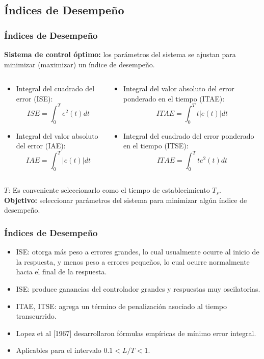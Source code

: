 \documentclass[aspectratio=169]{beamer}
\theoremstyle{definition}
\theoremstyle{plain}
\theoremstyle{remark}
\begin{document}
\subsection{Índices de Desempeño}
\begin{frame}[<+->]\frametitle{Índices de Desempeño}
	\textbf{Sistema de control óptimo:} los parámetros del sistema se ajustan para minimizar (maximizar) un índice de desempeño.
	\begin{columns}
	\begin{column}{0.5\textwidth}
	\begin{itemize}
		\item Integral del cuadrado del error (ISE):
		\begin{equation*}
			ISE = \int_0^T e^2(t) dt
		\end{equation*}
		\item Integral del valor absoluto del error (IAE):
		\begin{equation*}
			IAE = \int_0^T |e(t)| dt
		\end{equation*}
	\end{itemize}
	\end{column}	
	\begin{column}{0.5\textwidth}
	\begin{itemize}
		\item Integral del valor absoluto del error ponderado en el tiempo (ITAE):
		\begin{equation*}
			ITAE = \int_0^T t |e(t)| dt
		\end{equation*}
		\item Integral del cuadrado del error ponderado en el tiempo (ITSE):
		\begin{equation*}
			ITAE = \int_0^T t e^2(t) dt
		\end{equation*}
	\end{itemize}
	\end{column}	
	\end{columns}
	\vspace*{-5mm}
	\pause
	$T$: Es conveniente seleccionarlo como el tiempo de establecimiento $T_s$.\\
	\pause
	\textbf{Objetivo:} seleccionar parámetros del sistema para minimizar algún índice de desempeño.
\end{frame}

\begin{frame}[<+->]\frametitle{Índices de Desempeño}
	\begin{itemize}
		\item ISE: otorga más peso a errores grandes, lo cual usualmente ocurre al inicio de la respuesta, y menos peso a errores pequeños, lo cual ocurre normalmente hacia el final de la respuesta.
		\item ISE: produce ganancias del controlador grandes y respuestas muy oscilatorias.
		\item ITAE, ITSE: agrega un término de penalización asociado al tiempo transcurrido.
		\item Lopez et al [1967] desarrollaron fórmulas empíricas de mínimo error integral.
		\item Aplicables para el intervalo $0.1 < L/T < 1$.
	\end{itemize}
\end{frame}
\end{document}
